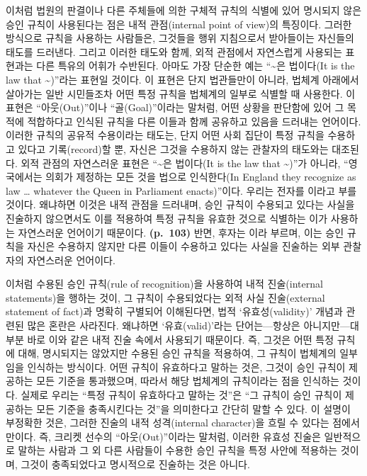 이처럼 법원의 판결이나 다른 주체들에 의한 구체적 규칙의 식별에 있어
명시되지 않은 승인 규칙이 사용된다는 점은 내적 관점(internal point of
view)의 특징이다. 그러한 방식으로 규칙을 사용하는 사람들은, 그것들을
행위 지침으로서 받아들이는 자신들의 태도를 드러낸다. 그리고 이러한
태도와 함께, 외적 관점에서 자연스럽게 사용되는 표현과는 다른 특유의
어휘가 수반된다. 아마도 가장 단순한 예는 ``\textasciitilde 은 법이다(It
is the law that \textasciitilde)''라는 표현일 것이다. 이 표현은 단지
법관들만이 아니라, 법체계 아래에서 살아가는 일반 시민들조차 어떤 특정
규칙을 법체계의 일부로 식별할 때 사용한다. 이 표현은 ``아웃(Out)''이나
``골(Goal)''이라는 말처럼, 어떤 상황을 판단함에 있어 그 목적에
적합하다고 인식된 규칙을 다른 이들과 함께 공유하고 있음을 드러내는
언어이다. 이러한 규칙의 공유적 수용이라는 태도는, 단지 어떤 사회 집단이
특정 규칙을 수용하고 있다고  기록(record)할 뿐,
자신은 그것을 수용하지 않는 관찰자의 태도와는 대조된다. 외적 관점의
자연스러운 표현은 ``\textasciitilde 은 법이다(It is the law that
\textasciitilde)''가 아니라, ``영국에서는 의회가 제정하는 모든 것을
법으로 인식한다(In England they recognize as law \ldots{} whatever the
Queen in Parliament enacts)''이다. 우리는 전자를 이라고 부를 것이다. 왜냐하면 이것은 내적 관점을
드러내며, 승인 규칙이 수용되고 있다는 사실을 진술하지 않으면서도 이를
적용하여 특정 규칙을 유효한 것으로 식별하는 이가 사용하는 자연스러운
언어이기 때문이다. \textbf{(p.~103)} 반면, 후자는 이라 부르며, 이는 승인 규칙을 자신은 수용하지
않지만 다른 이들이 수용하고 있다는 사실을 진술하는 외부 관찰자의
자연스러운 언어이다.

이처럼 수용된 승인 규칙(rule of recognition)을 사용하여 내적
진술(internal statements)을 행하는 것이, 그 규칙이 수용되었다는 외적
사실 진술(external statement of fact)과 명확히 구별되어 이해된다면, 법적
`유효성(validity)' 개념과 관련된 많은 혼란은 사라진다. 왜냐하면
`유효(valid)'라는 단어는---항상은 아니지만---대부분 바로 이와 같은 내적
진술 속에서 사용되기 때문이다. 즉, 그것은 어떤 특정 규칙에 대해,
명시되지는 않았지만 수용된 승인 규칙을 적용하여, 그 규칙이 법체계의
일부임을 인식하는 방식이다. 어떤 규칙이 유효하다고 말하는 것은, 그것이
승인 규칙이 제공하는 모든 기준을 통과했으며, 따라서 해당 법체계의
규칙이라는 점을 인식하는 것이다. 실제로 우리는 ``특정 규칙이 유효하다고
말하는 것''은 ``그 규칙이 승인 규칙이 제공하는 모든 기준을 충족시킨다는
것''을 의미한다고 간단히 말할 수 있다. 이 설명이 부정확한 것은, 그러한
진술의 내적 성격(internal character)을 흐릴 수 있다는 점에서만이다. 즉,
크리켓 선수의 ``아웃(Out)''이라는 말처럼, 이러한 유효성 진술은
일반적으로 말하는 사람과 그 외 다른 사람들이 수용한 승인 규칙을 특정
사안에 적용하는 것이며, 그것이 충족되었다고 명시적으로 진술하는 것은
아니다.

